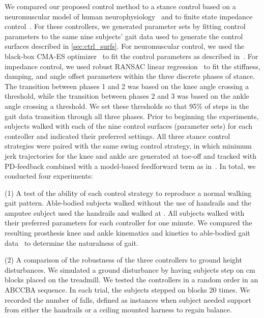 We compared our proposed control method to a stance control based on a
neuromuscular model of human neurophysiology~\citep{thatte2018method} and to
finite state impedance control~\citep{lawson2014robotic}. For these controllers,
we generated parameter sets by fitting control parameters to the same nine
subjects' gait data used to generate the control surfaces described in
\cref{sec:ctrl_surfs}. For neuromuscular control, we used the black-box CMA-ES
optimizer~\citep{hansen2006cma} to fit the control parameters as described
in~\citep{thatte2018method}. For impedance control, we used robust RANSAC linear
regression~\citep{fischler1981random} to fit the stiffness, damping, and angle
offset parameters within the three discrete phases of stance. The transition
between phases 1 and 2 was based on the knee angle crossing a threshold, while
the transition between phases 2 and 3 was based on the ankle angle crossing a
threshold. We set these thresholds so that 95\% of steps in the gait data
transition through all three phases. Prior to beginning the experiments,
subjects walked with each of the nine control surfaces (parameter sets) for each
controller and indicated their preferred settings. All three stance control
strategies were paired with the same swing control strategy, in which minimum
jerk trajectories for the knee and ankle are generated at toe-off and tracked
with PD-feedback combined with a model-based feedforward term as
in~\citep{lenzi2014speed}. In total, we conducted four experiments: 

(1) A test of the ability of each control strategy to reproduce a normal walking
gait pattern.  Able-bodied subjects walked without the use of handrails
 and the amputee subject used the handrails and walked at
.  All subjects walked with their preferred parameters for
each controller for one minute. We compared the resulting prosthesis knee and
ankle kinematics and kinetics to able-bodied gait data~\citep{bovi2011multiple}
to determine the naturalness of gait.

(2) A comparison of the robustness of the three controllers to ground height
disturbances. We simulated a ground disturbance by having subjects step on
\unit[3]{cm} blocks placed on the treadmill. We tested the controllers in a
random order in an ABCCBA sequence.  In each trial, the subjects stepped on
blocks 20 times. We recorded the number of falls, defined as instances when
subject needed support from either the handrails or a ceiling mounted harness to
regain balance.



